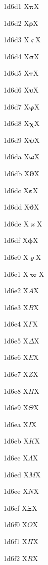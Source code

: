 \documentclass[11pt]{article}
\begin{document}
1d6d1 X{\ensuremath{\mathbf{\pi}}}X

1d6d2 X{\ensuremath{\mathbf{\rho}}}X

1d6d3 X{\ensuremath{\mathbf{\varsigma}}}X

1d6d4 X{\ensuremath{\mathbf{\sigma}}}X

1d6d5 X{\ensuremath{\mathbf{\tau}}}X

1d6d6 X{\ensuremath{\mathbf{\upsilon}}}X

1d6d7 X{\ensuremath{\mathbf{\varphi}}}X

1d6d8 X{\ensuremath{\mathbf{\chi}}}X

1d6d9 X{\ensuremath{\mathbf{\psi}}}X

1d6da X{\ensuremath{\mathbf{\omega}}}X

1d6db X{\ensuremath{\mathbf{\partial}}}X

1d6dc X{\ensuremath{\mathbf{\varepsilon}}}X

1d6dd X{\ensuremath{\mathbf{\vartheta}}}X

1d6de X{\ensuremath{\mathbf{\varkappa}}}X

1d6df X{\ensuremath{\mathbf{\phi}}}X

1d6e0 X{\ensuremath{\mathbf{\varrho}}}X

1d6e1 X{\ensuremath{\mathbf{\varpi}}}X

1d6e2 X{\ensuremath{\mathit{A}}}X

1d6e3 X{\ensuremath{\mathit{B}}}X

1d6e4 X{\ensuremath{\mathit{\Gamma}}}X

1d6e5 X{\ensuremath{\mathit{\Delta}}}X

1d6e6 X{\ensuremath{\mathit{E}}}X

1d6e7 X{\ensuremath{\mathit{Z}}}X

1d6e8 X{\ensuremath{\mathit{H}}}X

1d6e9 X{\ensuremath{\mathit{\Theta}}}X

1d6ea X{\ensuremath{\mathit{I}}}X

1d6eb X{\ensuremath{\mathit{K}}}X

1d6ec X{\ensuremath{\mathit{\Lambda}}}X

1d6ed X{\ensuremath{\mathit{M}}}X

1d6ee X{\ensuremath{\mathit{N}}}X

1d6ef X{\ensuremath{\mathit{\Xi}}}X

1d6f0 X{\ensuremath{\mathit{O}}}X

1d6f1 X{\ensuremath{\mathit{\Pi}}}X

1d6f2 X{\ensuremath{\mathit{R}}}X
\end{document}
